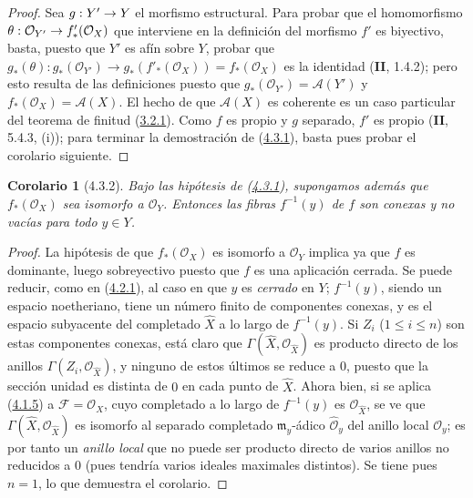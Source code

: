 \documentclass[10pt,oneside,openany]{book}
\theoremstyle{egaenv}\newtheorem*{env}{---}
\theoremstyle{egastatement}
\newtheorem*{corollary}{Corolario}
\theoremstyle{egadescription}
\renewcommand{\leq}{\leqslant}
\renewcommand{\to}{\mathchoice{\longrightarrow}{\rightarrow}{\rightarrow}{\rightarrow}}
\begin{document}
\begin{proof}
Sea $g:Y'\to Y$ el morfismo estructural. Para probar que el homomorfismo
$\theta:\mathcal O_{Y'}\to f'_*(\mathcal O_X)$ que interviene en la definición
del morfismo $f'$ es biyectivo, basta, puesto que $Y'$ es afín sobre $Y$,
probar que
$g_*(\theta):g_*(\mathcal O_{Y'})\longrightarrow
g_*(f'_*(\mathcal O_X))=f_*(\mathcal O_X)$
es la identidad (\textbf{II}, 1.4.2); pero esto resulta de las definiciones puesto que
$g_*(\mathcal O_{Y'})=\mathcal A(Y')$ y
$f_*(\mathcal O_X)=\mathcal A(X)$. El hecho de que $\mathcal A(X)$ es
coherente es un caso particular del teorema de finitud
(\hyperref[III.3.2.1-fr]{3.2.1}). Como $f$ es propio y $g$ separado,
$f'$ es propio (\textbf{II}, 5.4.3, (i)); para terminar la demostración de
(\hyperref[III.4.3.1-fr]{4.3.1}), basta pues probar el corolario
siguiente.
\end{proof}

\begin{corollary}[4.3.2]
\label{III.4.3.2-fr}
Bajo las hipótesis de \textup{(\hyperref[III.4.3.1-fr]{4.3.1})}, supongamos además
que $f_*(\mathcal O_X)$ sea isomorfo a $\mathcal O_Y$. Entonces las fibras
$f^{-1}(y)$ de $f$ son conexas y no vacías para todo $y\in Y$.
\end{corollary}

\begin{proof}
La hipótesis de que $f_*(\mathcal O_X)$ es isomorfo a $\mathcal O_Y$
implica ya que $f$ es dominante, luego sobreyectivo puesto que $f$ es una
aplicación cerrada. Se puede reducir, como en
(\hyperref[III.4.2.1-fr]{4.2.1}), al caso en que $y$ es \emph{cerrado} en $Y$;
$f^{-1}(y)$, siendo un espacio noetheriano, tiene un número finito de componentes
conexas, y es el espacio subyacente del completado $\widehat X$ a lo largo de
$f^{-1}(y)$. Si $Z_i$ ($1\leq i\leq n$) son estas componentes conexas, está
claro que $\Gamma(\widehat X,\mathcal O_{\widehat X})$ es producto
directo de los anillos $\Gamma(Z_i,\mathcal O_{\widehat X})$, y ninguno de estos
últimos se reduce a $0$, puesto que la sección unidad es distinta de
$0$ en cada punto de $\widehat X$. Ahora bien, si se aplica
(\hyperref[III.4.1.5-fr]{4.1.5}) a $\mathcal F=\mathcal O_X$, cuyo
completado a lo largo de $f^{-1}(y)$ es $\mathcal O_{\widehat X}$, se ve que
$\Gamma(\widehat X,\mathcal O_{\widehat X})$ es isomorfo al separado
completado $\mathfrak m_y$-ádico $\widehat{\mathcal O}_y$ del anillo local
$\mathcal O_y$; es por tanto un \emph{anillo local} que no puede ser producto
directo de varios anillos no reducidos a $0$ (pues tendría
varios ideales maximales distintos). Se tiene pues $n=1$, lo que demuestra el
corolario.
\end{proof}
\end{document}

